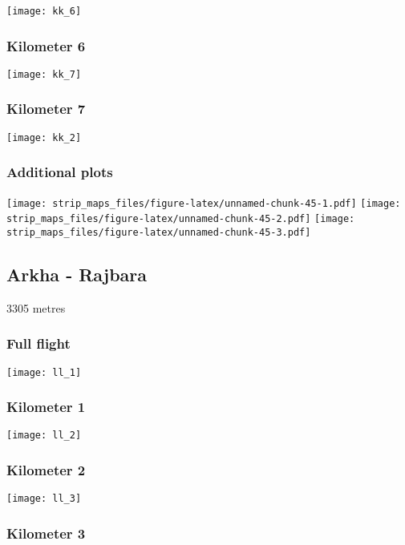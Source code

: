 \documentclass[]{article}
\begin{document}
\texttt{[image: kk\_6]}

\subsubsection{Kilometer 6}\label{kilometer-6-24}

\texttt{[image: kk\_7]}

\subsubsection{Kilometer 7}\label{kilometer-7-19}

\texttt{[image: kk\_2]}

\subsubsection{Additional plots}\label{additional-plots-36}

\texttt{[image: strip\_maps\_files/figure-latex/unnamed-chunk-45-1.pdf]}
\texttt{[image: strip\_maps\_files/figure-latex/unnamed-chunk-45-2.pdf]}
\texttt{[image: strip\_maps\_files/figure-latex/unnamed-chunk-45-3.pdf]}

\newpage

\subsection{Arkha - Rajbara}\label{arkha---rajbara}

3305 metres

\subsubsection{Full flight}\label{full-flight-37}

\texttt{[image: ll\_1]}

\subsubsection{Kilometer 1}\label{kilometer-1-37}

\texttt{[image: ll\_2]}

\subsubsection{Kilometer 2}\label{kilometer-2-37}

\texttt{[image: ll\_3]}

\subsubsection{Kilometer 3}\label{kilometer-3-37}
\end{document}
